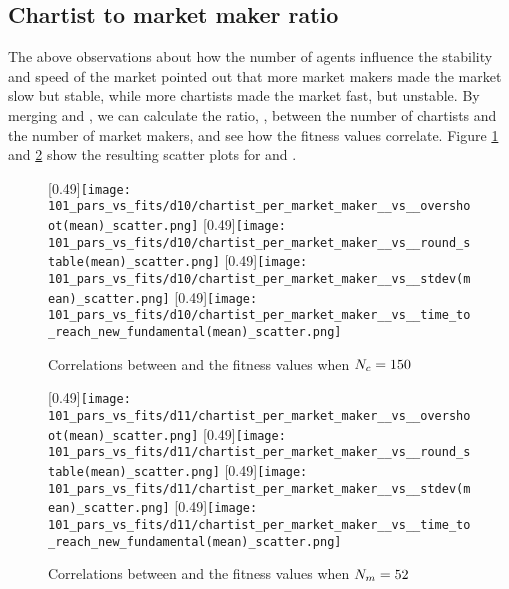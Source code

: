\subsection{Chartist to market maker ratio}

The above observations about how the number of agents influence the stability and speed of the market pointed out that more market makers made the market slow but stable, while more chartists made the market fast, but unstable. By merging \datamatrixpar{\dten} and \datamatrixpar{\deleven}, we can calculate the ratio, \ratioagents, between the number of chartists and the number of market makers, and see how the fitness values correlate. Figure \ref{fig:parvfit_ratio_d10} and \ref{fig:parvfit_ratio_d11} show the resulting scatter plots for \dten{} and \deleven. 

\begin{figure}
	\centering
	\subcaptionbox{}
	[0.49\linewidth]{\texttt{[image: 101\_pars\_vs\_fits/d10/chartist\_per\_market\_maker\_\_vs\_\_overshoot(mean)\_scatter.png]}}
	\subcaptionbox{}
	[0.49\linewidth]{\texttt{[image: 101\_pars\_vs\_fits/d10/chartist\_per\_market\_maker\_\_vs\_\_round\_stable(mean)\_scatter.png]}}
	\subcaptionbox{}
	[0.49\linewidth]{\texttt{[image: 101\_pars\_vs\_fits/d10/chartist\_per\_market\_maker\_\_vs\_\_stdev(mean)\_scatter.png]}}
	\subcaptionbox{}
	[0.49\linewidth]{\texttt{[image: 101\_pars\_vs\_fits/d10/chartist\_per\_market\_maker\_\_vs\_\_time\_to\_reach\_new\_fundamental(mean)\_scatter.png]}}
	\caption{Correlations between \ratioagents{} and the fitness values when $N_{c} = 150$}
	\label{fig:parvfit_ratio_d10}
\end{figure}

\begin{figure}
	\centering
	\subcaptionbox{}
	[0.49\linewidth]{\texttt{[image: 101\_pars\_vs\_fits/d11/chartist\_per\_market\_maker\_\_vs\_\_overshoot(mean)\_scatter.png]}}
	\subcaptionbox{}
	[0.49\linewidth]{\texttt{[image: 101\_pars\_vs\_fits/d11/chartist\_per\_market\_maker\_\_vs\_\_round\_stable(mean)\_scatter.png]}}
	\subcaptionbox{}
	[0.49\linewidth]{\texttt{[image: 101\_pars\_vs\_fits/d11/chartist\_per\_market\_maker\_\_vs\_\_stdev(mean)\_scatter.png]}}
	\subcaptionbox{}
	[0.49\linewidth]{\texttt{[image: 101\_pars\_vs\_fits/d11/chartist\_per\_market\_maker\_\_vs\_\_time\_to\_reach\_new\_fundamental(mean)\_scatter.png]}}
	\caption{Correlations between \ratioagents{} and the fitness values when $N_{m} = 52$}
	\label{fig:parvfit_ratio_d11}
\end{figure}








